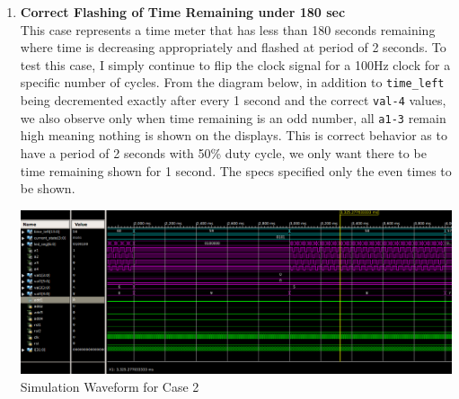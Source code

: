 \documentclass{article}
\begin{document}
\begin{enumerate}
    \item \textbf{Correct Flashing of Time Remaining under 180 sec}\\
    This case represents a time meter that has less than 180 seconds remaining where time is decreasing appropriately and flashed at period of 2 seconds. To test this case, I simply continue to flip the clock signal for a 100Hz clock for a specific number of cycles. From the diagram below, in addition to \texttt{time\_left} being decremented exactly after every 1 second and the correct \texttt{val-4} values, we also observe only when time remaining is an odd number, all \texttt{a1-3} remain high meaning nothing is shown on the displays. This is correct behavior as to have a period of 2 seconds with 50\% duty cycle, we only want there to be time remaining shown for 1 second. The specs specified only the even times to be shown. 
    \begin{center}
        \includegraphics[scale=0.34]{waveform-2.png} \\
        \caption{Simulation Waveform for Case 2}
    \end{center}  \par


\end{enumerate}
\end{document}
